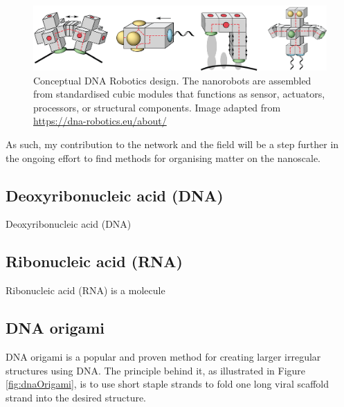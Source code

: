 \begin{figure}
    \centering\includegraphics[width=\textwidth]{figures/dnaRoboticsHeader.png} 
    \caption{Conceptual DNA Robotics design. The nanorobots are assembled from standardised cubic modules that functions as sensor, actuators, processors, or structural components. Image adapted from \url{https://dna-robotics.eu/about/}}
    \label{fig:dnaRoboticsHeader}
\end{figure}

As such, my contribution to the network and the field will be a step further in the ongoing effort to find methods for organising matter on the nanoscale.

\subsection{Deoxyribonucleic acid (DNA)}
Deoxyribonucleic acid (DNA)

\subsection{Ribonucleic acid (RNA)}
Ribonucleic acid (RNA) is a molecule

\subsection{DNA origami}

DNA origami\cite{rothemund2006folding} is a popular and proven method for creating larger irregular structures using DNA. The principle behind it, as illustrated in Figure \ref{fig:dnaOrigami}, is to use short staple strands to fold one long viral scaffold strand into the desired structure.

